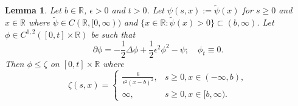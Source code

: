 \documentclass[12pt,a4paper]{amsart}
\numberwithin{equation}{section}
\theoremstyle{plain}
\newtheorem{lemma}[theorem]{Lemma}
\theoremstyle{remark}
\begin{document}
\begin{lemma}
	Let $b\in \mathbb R$, $\epsilon > 0$ and $t>0$. 
	Let $\psi(s,x):= \tilde \psi (x)$ for $s\geq 0$ and $x\in \mathbb R$ where $\tilde \psi \in C(\mathbb R, [0,\infty))$ and $\{x\in \mathbb R:\tilde \psi(x) >0\} \subset (b,\infty)$.
	Let $\phi \in C^{1,2}([0,t]\times \mathbb R)$ be such that
\begin{equation}
	\partial \phi = - \frac{1}{2}\Delta\phi + \frac{1}{2}\epsilon^2 \phi^2 - \psi; \quad \phi_t \equiv 0.
\end{equation}
	Then $\phi \leq \zeta$ on $[0,t] \times \mathbb R$ where
	\[
	\zeta(s,x) = 
	\begin{cases}
	\frac{6}{\epsilon^2 (x-b)^2}, & s\geq 0,x\in (-\infty, b),
	\\ \infty, & s\geq 0, x\in [b, \infty).
	\end{cases}
	\]
\end{lemma}
\end{document}
